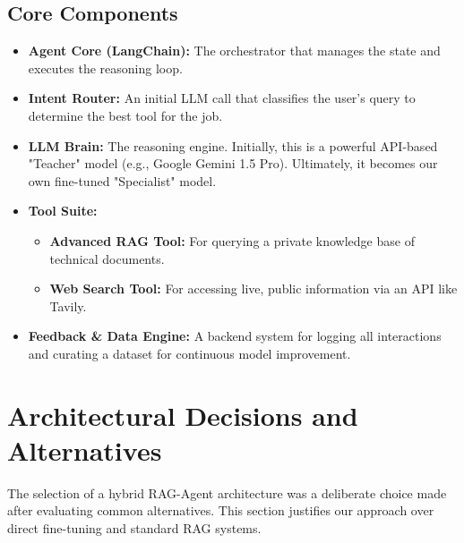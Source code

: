 \documentclass[11pt, a4paper]{article}
\begin{document}
\subsection{Core Components}
\begin{itemize}
    \item \textbf{Agent Core (LangChain):} The orchestrator that manages the state and executes the reasoning loop.
    \item \textbf{Intent Router:} An initial LLM call that classifies the user's query to determine the best tool for the job.
    \item \textbf{LLM Brain:} The reasoning engine. Initially, this is a powerful API-based "Teacher" model (e.g., Google Gemini 1.5 Pro). Ultimately, it becomes our own fine-tuned "Specialist" model.
    \item \textbf{Tool Suite:}
    \begin{itemize}
        \item \textbf{Advanced RAG Tool:} For querying a private knowledge base of technical documents.
        \item \textbf{Web Search Tool:} For accessing live, public information via an API like Tavily.
    \end{itemize}
    \item \textbf{Feedback \& Data Engine:} A backend system for logging all interactions and curating a dataset for continuous model improvement.
\end{itemize}

\section{Architectural Decisions and Alternatives}
The selection of a hybrid RAG-Agent architecture was a deliberate choice made after evaluating common alternatives. This section justifies our approach over direct fine-tuning and standard RAG systems.
\end{document}
